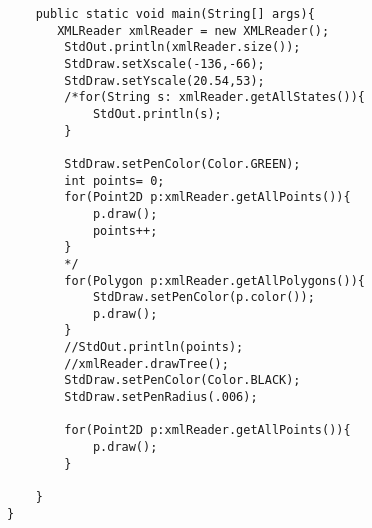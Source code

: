 \begin{verbatim}
    public static void main(String[] args){
       XMLReader xmlReader = new XMLReader();
        StdOut.println(xmlReader.size());
        StdDraw.setXscale(-136,-66);
        StdDraw.setYscale(20.54,53);
        /*for(String s: xmlReader.getAllStates()){
            StdOut.println(s);
        }

        StdDraw.setPenColor(Color.GREEN);
        int points= 0;
        for(Point2D p:xmlReader.getAllPoints()){
            p.draw();
            points++;
        }
        */
        for(Polygon p:xmlReader.getAllPolygons()){
            StdDraw.setPenColor(p.color());
            p.draw();
        }
        //StdOut.println(points);
        //xmlReader.drawTree();
        StdDraw.setPenColor(Color.BLACK);
        StdDraw.setPenRadius(.006);

        for(Point2D p:xmlReader.getAllPoints()){
            p.draw();
        }

    }
}
\end{verbatim}
